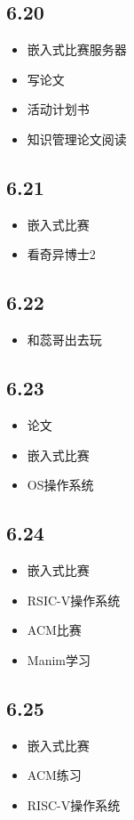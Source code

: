 \documentclass[UTF8]{ctexart}
\begin{document}
\subsection*{6.20}
\begin{itemize}
    \item 嵌入式比赛服务器
    \item 写论文
    \item 活动计划书
    \item 知识管理论文阅读
\end{itemize}
\subsection*{6.21}
\begin{itemize}
    \item 嵌入式比赛
    \item 看奇异博士2
\end{itemize}
\subsection*{6.22}
\begin{itemize}
    \item 和蕊哥出去玩
\end{itemize}
\subsection*{6.23}
\begin{itemize}
    \item 论文
    \item 嵌入式比赛
    \item OS操作系统
\end{itemize}
\subsection*{6.24}
\begin{itemize}
    \item 嵌入式比赛
    \item RSIC-V操作系统
    \item ACM比赛
    \item Manim学习
\end{itemize}
\subsection*{6.25}
\begin{itemize}
    \item 嵌入式比赛
    \item ACM练习
    \item RISC-V操作系统
\end{itemize}
\end{document}
